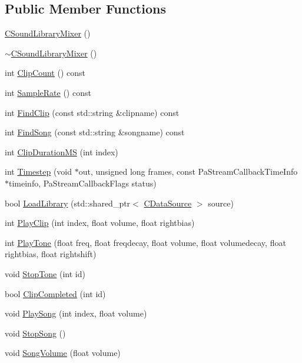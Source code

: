 \subsection*{Public Member Functions}
\begin{DoxyCompactItemize}
\item 
\hyperlink{classCSoundLibraryMixer_a555dc21fe5bd397e09b524c5f0975a08}{C\+Sound\+Library\+Mixer} ()
\item 
\hyperlink{classCSoundLibraryMixer_a73733f975356d1f21834d72503bc580f}{$\sim$\+C\+Sound\+Library\+Mixer} ()
\item 
int \hyperlink{classCSoundLibraryMixer_a3abff4a43967eb0975ded98011c23e4e}{Clip\+Count} () const
\item 
int \hyperlink{classCSoundLibraryMixer_a03221f151dfe72381da5d0d0539bab94}{Sample\+Rate} () const
\item 
int \hyperlink{classCSoundLibraryMixer_ad8cc956bda999fe677e92f7392834b7a}{Find\+Clip} (const std\+::string \&clipname) const
\item 
int \hyperlink{classCSoundLibraryMixer_a67d0364979fab26c2b2467357ec03696}{Find\+Song} (const std\+::string \&songname) const
\item 
int \hyperlink{classCSoundLibraryMixer_a0492c587cb62cd8945880a7de3dad490}{Clip\+Duration\+MS} (int index)
\item 
int \hyperlink{classCSoundLibraryMixer_ad3ef0b67b77862e8c88949c3415095e7}{Timestep} (void $\ast$out, unsigned long frames, const Pa\+Stream\+Callback\+Time\+Info $\ast$timeinfo, Pa\+Stream\+Callback\+Flags status)
\item 
bool \hyperlink{classCSoundLibraryMixer_a9753684f44863e3c7cc4d319370cda1d}{Load\+Library} (std\+::shared\+\_\+ptr$<$ \hyperlink{classCDataSource}{C\+Data\+Source} $>$ source)
\item 
int \hyperlink{classCSoundLibraryMixer_a9af6d9e3dacf63b07a7ad75e629bdc2f}{Play\+Clip} (int index, float volume, float rightbias)
\item 
int \hyperlink{classCSoundLibraryMixer_a48bf99193d92c07a5c5229d58a10d9fe}{Play\+Tone} (float freq, float freqdecay, float volume, float volumedecay, float rightbias, float rightshift)
\item 
void \hyperlink{classCSoundLibraryMixer_ab57bc3217de14130ed95c48223351ce3}{Stop\+Tone} (int id)
\item 
bool \hyperlink{classCSoundLibraryMixer_acd11bc59b6f11b1a8e1f0e821f0b8207}{Clip\+Completed} (int id)
\item 
void \hyperlink{classCSoundLibraryMixer_ad8fdd1f573967a8124cd4bc4a8c29ea1}{Play\+Song} (int index, float volume)
\item 
void \hyperlink{classCSoundLibraryMixer_a13fdebfbc5fdee60067c38a3c60dd2a9}{Stop\+Song} ()
\item 
void \hyperlink{classCSoundLibraryMixer_ad38d70e5783e3b67fdf022877549ccf8}{Song\+Volume} (float volume)
\end{DoxyCompactItemize}
